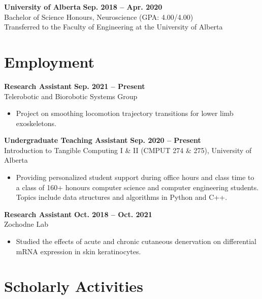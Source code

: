 \documentclass{article}
\begin{document}
\textbf{University of Alberta} \hfill \textbf{Sep. 2018 -- Apr. 2020} \\
Bachelor of Science Honours, Neuroscience (GPA: 4.00/4.00) \\
Transferred to the Faculty of Engineering at the University of Alberta


\section*{\textcolor{my_colour}{Employment}}
\vspace{-.25em} \hrulefill \vspace{.75em}

\textbf{Research Assistant} \hfill \textbf{Sep. 2021 -- Present}\\
Telerobotic and Biorobotic Systems Group
\begin{itemize}
    \item Project on smoothing locomotion trajectory transitions for lower limb exoskeletons.
\end{itemize}

\textbf{Undergraduate Teaching Assistant} \hfill \textbf{Sep. 2020 -- Present}\\
Introduction to Tangible Computing I \& II (CMPUT 274 \& 275), University of Alberta
\begin{itemize}
    \item Providing personalized student support during office hours and class time to a class of 160+ honours computer science and computer engineering students. Topics include data structures and algorithms in Python and C++.
\end{itemize}

\textbf{Research Assistant} \hfill \textbf{Oct. 2018 -- Oct. 2021}\\
Zochodne Lab
\begin{itemize}
    \item Studied the effects of acute and chronic cutaneous denervation on differential mRNA expression in skin keratinocytes.
\end{itemize}


\section*{\textcolor{my_colour}{Scholarly Activities}}
\vspace{-.25em} \hrulefill \vspace{.75em}
\end{document}
